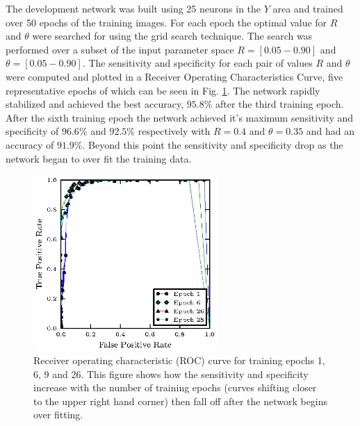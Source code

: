 \documentclass[conference]{IEEEtran}
\begin{document}
The development network was built using 25 neurons in the $Y$ area and trained over 50 epochs of the training images.  For each epoch the optimal value for $R$ and $\theta$ were searched for using the grid search technique.  The search was performed over a subset of the input parameter space $R=[0.05-0.90]$ and $\theta=[0.05-0.90]$.  The sensitivity and specificity for each pair of values $R$ and $\theta$ were computed and plotted in a Receiver Operating Characteristics Curve, five representative epochs of which can be seen in Fig. \ref{fig:roc}. The network rapidly stabilized and achieved the best accuracy, $95.8\%$ after the third training epoch.  After the sixth training epoch the network achieved it's maximum sensitivity and specificity of $96.6\%$ and $92.5\%$ respectively with $R=0.4$ and $\theta=0.35$ and had an accuracy of $91.9\%$.  Beyond this point the sensitivity and specificity drop as the network began to over fit the training data.  

\begin{figure}
\center
\fontsize{8}{12}\selectfont
\includegraphics[width=2.75in]{figs/roc.eps}
\caption{Receiver operating characteristic (ROC) curve for training epochs 1, 6, 9 and 26.  This figure shows how the sensitivity and specificity increase with the number of training epochs (curves shifting closer to the upper right hand corner) then fall off after the network begins over fitting.}
\label{fig:roc}
\end{figure}
\end{document}
